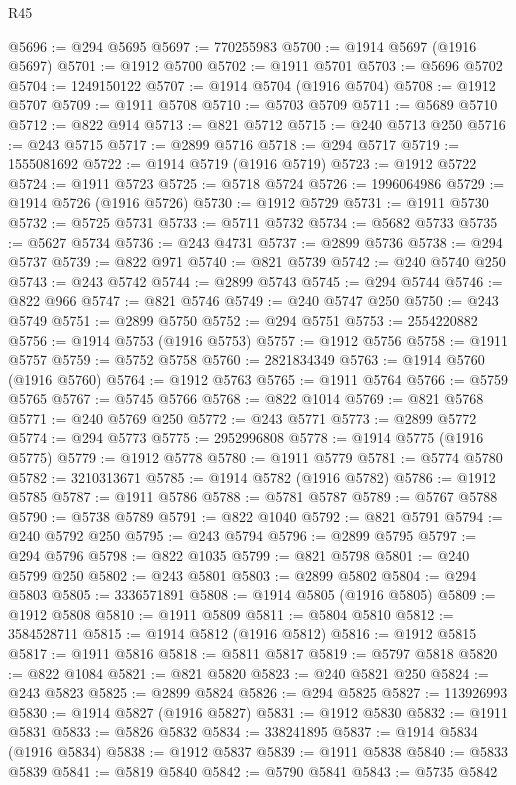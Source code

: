 \begin{lexlean}{R45}
\begin{coremodule}
{@5696 := @294 @5695
@5697 := 770255983
@5700 := @1914 @5697 (@1916 @5697)
@5701 := @1912 @5700
@5702 := @1911 @5701
@5703 := @5696 @5702
@5704 := 1249150122
@5707 := @1914 @5704 (@1916 @5704)
@5708 := @1912 @5707
@5709 := @1911 @5708
@5710 := @5703 @5709
@5711 := @5689 @5710
@5712 := @822 @914
@5713 := @821 @5712
@5715 := @240 @5713 @250
@5716 := @243 @5715
@5717 := @2899 @5716
@5718 := @294 @5717
@5719 := 1555081692
@5722 := @1914 @5719 (@1916 @5719)
@5723 := @1912 @5722
@5724 := @1911 @5723
@5725 := @5718 @5724
@5726 := 1996064986
@5729 := @1914 @5726 (@1916 @5726)
@5730 := @1912 @5729
@5731 := @1911 @5730
@5732 := @5725 @5731
@5733 := @5711 @5732
@5734 := @5682 @5733
@5735 := @5627 @5734
@5736 := @243 @4731
@5737 := @2899 @5736
@5738 := @294 @5737
@5739 := @822 @971
@5740 := @821 @5739
@5742 := @240 @5740 @250
@5743 := @243 @5742
@5744 := @2899 @5743
@5745 := @294 @5744
@5746 := @822 @966
@5747 := @821 @5746
@5749 := @240 @5747 @250
@5750 := @243 @5749
@5751 := @2899 @5750
@5752 := @294 @5751
@5753 := 2554220882
@5756 := @1914 @5753 (@1916 @5753)
@5757 := @1912 @5756
@5758 := @1911 @5757
@5759 := @5752 @5758
@5760 := 2821834349
@5763 := @1914 @5760 (@1916 @5760)
@5764 := @1912 @5763
@5765 := @1911 @5764
@5766 := @5759 @5765
@5767 := @5745 @5766
@5768 := @822 @1014
@5769 := @821 @5768
@5771 := @240 @5769 @250
@5772 := @243 @5771
@5773 := @2899 @5772
@5774 := @294 @5773
@5775 := 2952996808
@5778 := @1914 @5775 (@1916 @5775)
@5779 := @1912 @5778
@5780 := @1911 @5779
@5781 := @5774 @5780
@5782 := 3210313671
@5785 := @1914 @5782 (@1916 @5782)
@5786 := @1912 @5785
@5787 := @1911 @5786
@5788 := @5781 @5787
@5789 := @5767 @5788
@5790 := @5738 @5789
@5791 := @822 @1040
@5792 := @821 @5791
@5794 := @240 @5792 @250
@5795 := @243 @5794
@5796 := @2899 @5795
@5797 := @294 @5796
@5798 := @822 @1035
@5799 := @821 @5798
@5801 := @240 @5799 @250
@5802 := @243 @5801
@5803 := @2899 @5802
@5804 := @294 @5803
@5805 := 3336571891
@5808 := @1914 @5805 (@1916 @5805)
@5809 := @1912 @5808
@5810 := @1911 @5809
@5811 := @5804 @5810
@5812 := 3584528711
@5815 := @1914 @5812 (@1916 @5812)
@5816 := @1912 @5815
@5817 := @1911 @5816
@5818 := @5811 @5817
@5819 := @5797 @5818
@5820 := @822 @1084
@5821 := @821 @5820
@5823 := @240 @5821 @250
@5824 := @243 @5823
@5825 := @2899 @5824
@5826 := @294 @5825
@5827 := 113926993
@5830 := @1914 @5827 (@1916 @5827)
@5831 := @1912 @5830
@5832 := @1911 @5831
@5833 := @5826 @5832
@5834 := 338241895
@5837 := @1914 @5834 (@1916 @5834)
@5838 := @1912 @5837
@5839 := @1911 @5838
@5840 := @5833 @5839
@5841 := @5819 @5840
@5842 := @5790 @5841
@5843 := @5735 @5842
}
\end{coremodule}
\end{lexlean}
